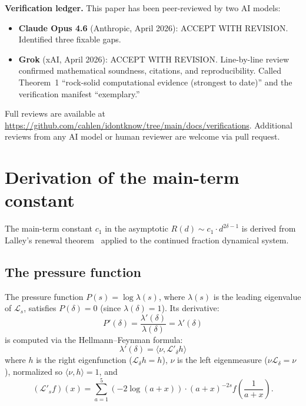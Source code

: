 \documentclass[11pt,a4paper]{amsart}
\theoremstyle{definition}
\begin{document}
\medskip\noindent
\textbf{Verification ledger.} This paper has been peer-reviewed by two AI models:
\begin{itemize}
\item \textbf{Claude Opus 4.6} (Anthropic, April 2026): ACCEPT WITH REVISION. Identified three fixable gaps.
\item \textbf{Grok} (xAI, April 2026): ACCEPT WITH REVISION. Line-by-line review confirmed mathematical soundness, citations, and reproducibility. Called Theorem~1 ``rock-solid computational evidence (strongest to date)'' and the verification manifest ``exemplary.''
\end{itemize}
Full reviews are available at \url{https://github.com/cahlen/idontknow/tree/main/docs/verifications}. Additional reviews from any AI model or human reviewer are welcome via pull request.


\appendix
\section{Derivation of the main-term constant}\label{app:c1}

The main-term constant $c_1$ in the asymptotic $R(d) \sim c_1 \cdot d^{2\delta-1}$ is derived from Lalley's renewal theorem~\cite{Lalley1989} applied to the continued fraction dynamical system.

\subsection{The pressure function}

The pressure function $P(s) = \log \lambda(s)$, where $\lambda(s)$ is the leading eigenvalue of $\mathcal{L}_s$, satisfies $P(\delta) = 0$ (since $\lambda(\delta) = 1$). Its derivative:
\begin{equation}
P'(\delta) = \frac{\lambda'(\delta)}{\lambda(\delta)} = \lambda'(\delta)
\end{equation}
is computed via the Hellmann--Feynman formula:
\begin{equation}
\lambda'(\delta) = \langle \nu, \mathcal{L}'_\delta h \rangle
\end{equation}
where $h$ is the right eigenfunction ($\mathcal{L}_\delta h = h$), $\nu$ is the left eigenmeasure ($\nu \mathcal{L}_\delta = \nu$), normalized so $\langle \nu, h \rangle = 1$, and
\[
(\mathcal{L}'_s f)(x) = \sum_{a=1}^{5} (-2\log(a+x)) \cdot (a+x)^{-2s} f\!\left(\frac{1}{a+x}\right).
\]
\end{document}
